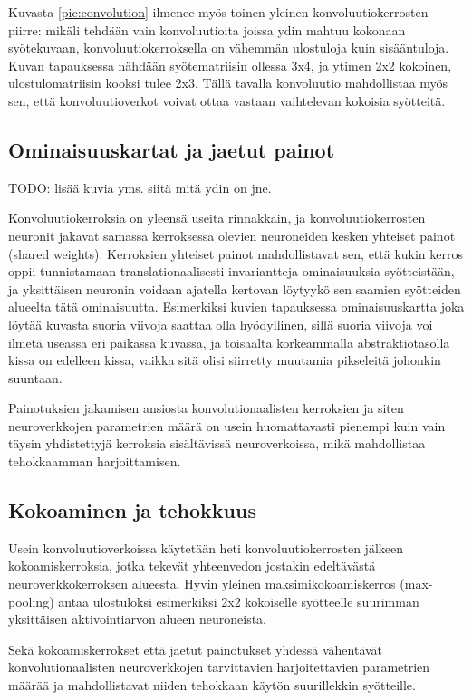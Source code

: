 \documentclass[finnish]{tktltiki2}
\theoremstyle{definition}
\theoremstyle{remark}
\begin{document}
    Kuvasta \ref{pic:convolution} ilmenee myös toinen yleinen konvoluutiokerrosten piirre: mikäli tehdään vain konvoluutioita joissa ydin mahtuu kokonaan syötekuvaan, konvoluutiokerroksella on vähemmän ulostuloja kuin sisääntuloja. Kuvan tapauksessa nähdään syötematriisin ollessa 3x4, ja ytimen 2x2 kokoinen, ulostulomatriisin kooksi tulee 2x3. Tällä tavalla konvoluutio mahdollistaa myös sen, että konvoluutioverkot voivat ottaa vastaan vaihtelevan kokoisia syötteitä.

    \subsection{Ominaisuuskartat ja jaetut painot}
  TODO: lisää kuvia yms. siitä mitä ydin on jne.

    Konvoluutiokerroksia on yleensä useita rinnakkain, ja konvoluutiokerrosten neuronit jakavat samassa kerroksessa olevien neuroneiden kesken yhteiset painot (shared weights). Kerroksien yhteiset painot mahdollistavat sen, että kukin kerros oppii tunnistamaan translationaalisesti invariantteja ominaisuuksia syötteistään, ja yksittäisen neuronin voidaan ajatella kertovan löytyykö sen saamien syötteiden alueelta tätä ominaisuutta. Esimerkiksi kuvien tapauksessa ominaisuuskartta joka löytää kuvasta suoria viivoja saattaa olla hyödyllinen, sillä suoria viivoja voi ilmetä useassa eri paikassa kuvassa, ja toisaalta korkeammalla abstraktiotasolla kissa on edelleen kissa, vaikka sitä olisi siirretty muutamia pikseleitä johonkin suuntaan.

    Painotuksien jakamisen ansiosta konvolutionaalisten kerroksien ja siten neuroverkkojen parametrien määrä on usein huomattavasti pienempi kuin vain täysin yhdistettyjä kerroksia sisältävissä neuroverkoissa, mikä mahdollistaa tehokkaamman harjoittamisen.
    \subsection{Kokoaminen ja tehokkuus}
    Usein konvoluutioverkoissa käytetään heti konvoluutiokerrosten jälkeen kokoamiskerroksia, jotka tekevät yhteenvedon jostakin edeltävästä neuroverkkokerroksen alueesta. Hyvin yleinen maksimikokoamiskerros (max-pooling) antaa ulostuloksi esimerkiksi 2x2 kokoiselle syötteelle suurimman yksittäisen aktivointiarvon alueen neuroneista.

    Sekä kokoamiskerrokset että jaetut painotukset yhdessä vähentävät konvolutionaalisten neuroverkkojen tarvittavien harjoitettavien parametrien määrää ja mahdollistavat niiden tehokkaan käytön suurillekkin syötteille.
\end{document}

